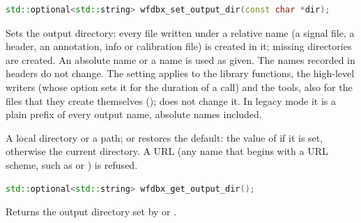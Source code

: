 \begin{lstlisting}[language=C++,style=signature]
std::optional<std::string> wfdbx_set_output_dir(const char *dir);
\end{lstlisting}
Sets the output directory: every file written under a relative name (a
signal file, a header, an annotation, info or calibration file) is created
in it; missing directories are created. An absolute name or a
\code{\textasciitilde} name is used as given. The names recorded in headers
do not change. The setting applies to the library functions, the high-level
writers (whose  option sets it for the duration of a call) and the
tools, also for the files that they create themselves
();  does not change it. In legacy
mode it is a plain prefix of every output name, absolute names included.
\begin{params}
\item[dir] A local directory or a \code{\textasciitilde} path;  or
   restores the default: the value of  if it
  is set, otherwise the current directory. A URL (any name that begins with a
  URL scheme, such as  or ) is refused.
\end{params}

\begin{lstlisting}[language=C++,style=signature]
std::optional<std::string> wfdbx_get_output_dir();
\end{lstlisting}
Returns the output directory set by  or
.

